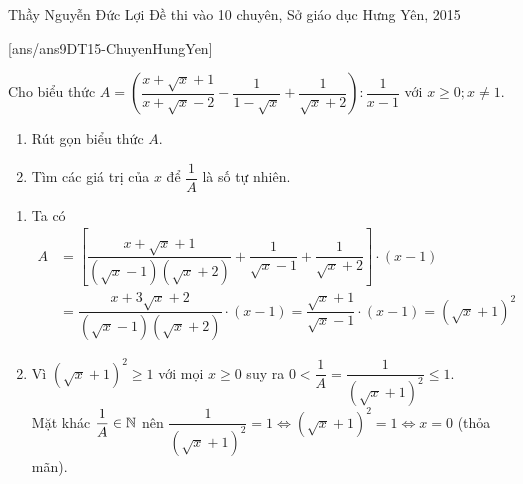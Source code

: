 \begin{name}
{Thầy  Nguyễn Đức Lợi}
{Đề thi vào 10 chuyên, Sở giáo dục Hưng Yên, 2015}
\end{name}
\setcounter{ex}{0}
[ans/ans9DT15-ChuyenHungYen]
\begin{ex}%
    Cho biểu thức $A=\left(\dfrac{x+\sqrt{x}+1}{x+\sqrt{x}-2}-\dfrac{1}{1-\sqrt{x}}+\dfrac{1}{\sqrt{x}+2}\right):\dfrac{1}{x-1}$ với $x\ge 0; x \ne 1$.
    \begin{enumerate}
        \item Rút gọn biểu thức $A$.
        \item Tìm các giá trị của $x$ để $\dfrac{1}{A}$ là số tự nhiên.
    \end{enumerate}
\loigiai
    {
   \begin{enumerate}
   \item Ta có
   {\allowdisplaybreaks
   \begin{align*}
   A&= \left[\dfrac{x+\sqrt{x}+1}{\left(\sqrt{x}-1\right)\left(\sqrt{x}+2\right)}+\dfrac{1}{\sqrt{x}-1}+\dfrac{1}{\sqrt{x}+2}\right]\cdot(x-1)\\
   &=\dfrac{x+3\sqrt{x}+2}{\left(\sqrt{x}-1\right)\left(\sqrt{x}+2\right)}\cdot (x-1)=\dfrac{\sqrt{x}+1}{\sqrt{x}-1}\cdot (x-1)= \left(\sqrt{x}+1\right)^2
   \end{align*}}
   \item Vì $\left(\sqrt{x}+1\right)^2 \geq 1 $ với mọi $x \geq 0$ suy ra $0<\dfrac{1}{A}=\dfrac{1}{\left(\sqrt{x}+1\right)^2}\le 1$. \\
   Mặt khác $\dfrac{1}{A}\in \Bbb N$ nên $\dfrac{1}{\left(\sqrt{x}+1\right)^2}=1 \Leftrightarrow \left(\sqrt{x}+1\right)^2=1 \Leftrightarrow x=0$ (thỏa mãn).
   \end{enumerate}
    }
\end{ex}

